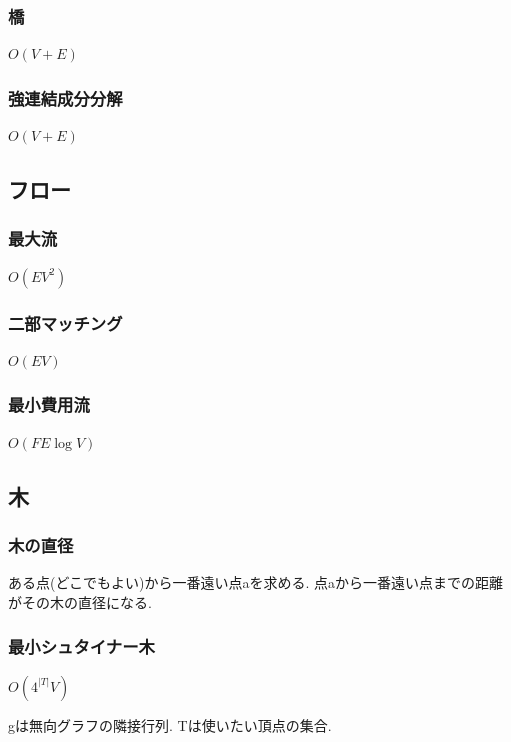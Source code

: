 \documentclass[9pt,twocolumn,a4paper,landscape]{extarticle}
\begin{document}
\subsubsection{橋}
$O(V+E)$\par


\subsubsection{強連結成分分解}
$O(V+E)$\par


\subsection{フロー}
\subsubsection{最大流}
$O(EV^2)$\par


\subsubsection{二部マッチング}
$O(EV)$\par


\subsubsection{最小費用流}
$O(FE\log V)$\par


\subsection{木}
\subsubsection{木の直径}
ある点(どこでもよい)から一番遠い点aを求める. 点aから一番遠い点までの距離がその木の直径になる.\par
\subsubsection{最小シュタイナー木}
$O(4^{|T|}V)$ \par
gは無向グラフの隣接行列. Tは使いたい頂点の集合.\par

\end{document}
